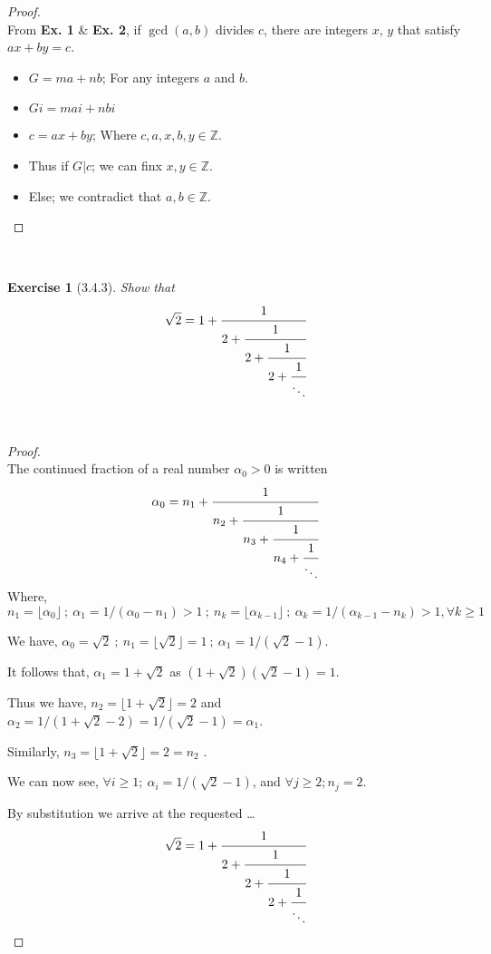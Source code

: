 \documentclass[12pt]{article}
\newcommand{\XB}{\color{black}}
\newcommand{\XBB}{\color{blue}}
\newcommand{\ds}{\displaystyle}
\theoremstyle{plain}
\newtheorem{ex}{Exercise}
\begin{document}
\begin{proof}
  \ \\

  From \textbf{Ex. 1} \& \textbf{Ex. 2}, if $\gcd(a,b)$ divides $c$, there are integers $x$, $y$ that satisfy $ax + by = c$.

  \begin{itemize}
    \item $ \ds G = ma + nb $; For any integers $a$ and $b$.
    \item $ \ds Gi = mai + nbi $
    \item $ \ds c = ax + by $; Where $ c,a,x,b,y \in \mathbb{Z} $.
    \item Thus if $ G | c $; we can finx $ x,y \in \mathbb{Z} $.
    \item Else; we contradict that $ a,b \in \mathbb{Z} $.
  \end{itemize}

\end{proof}

\newpage

\XBB\hrulefill\XB \\
\begin{ex} [3.4.3]
  Show that
  \[
    \sqrt{2} = 1 + \cfrac{1}{2 + \cfrac{1}{2 + \cfrac{1}{2 + \cfrac{1}{\ddots}}}}
  \]
\end{ex}
\XBB\hrulefill\XB \\

\begin{proof}
  \ \\

  The continued fraction of a real number $ \alpha_{0} > 0 $ is written 
  \[
    \alpha_{0} = n_{1} + \cfrac{1}{n_{2} + \cfrac{1}{n_{3} + \cfrac{1}{n_{4} + \cfrac{1}{\ddots}}}}
  \]
  Where, $ n_{1} = \lfloor \alpha_{0} \rfloor \ ; \ \alpha_{1} = 1/(\alpha_{0} - n_{1}) > 1 \ ; \ n_{k} = \lfloor \alpha_{k-1} \rfloor \ ; \ \alpha_{k} = 1/(\alpha_{k-1} - n_{k}) > 1, \forall k \ge 1 $ 
  
  We have, $ \alpha_{0} = \sqrt{2} \ ; \ n_{1} = \lfloor \sqrt{2} \rfloor = 1 \ ; \ \alpha_{1} = 1/(\sqrt{2} - 1) $.

  It follows that, $ \alpha_{1} = 1 + \sqrt{2} $ as $ (1 + \sqrt{2})(\sqrt{2} - 1) = 1 $.

  Thus we have, $ n_{2} = \lfloor 1 + \sqrt{2} \rfloor = 2 $ and $ \alpha_{2} = 1/(1 + \sqrt{2} - 2) = 1/(\sqrt{2} - 1) = \alpha_{1} $.

  Similarly, $ n_{3} = \lfloor 1 + \sqrt{2} \rfloor = 2 = n_{2} $ .
  
  We can now see, $ \forall i \ge 1 ; \ \alpha_{i} = 1/(\sqrt{2} - 1) $, and $ \forall j \ge 2 ; n_{j} = 2 $.

  By substitution we arrive at the requested \dots
  \[
    \sqrt{2} = 1 + \cfrac{1}{2 + \cfrac{1}{2 + \cfrac{1}{2 + \cfrac{1}{\ddots}}}}
  \]
\end{proof}
\end{document}
